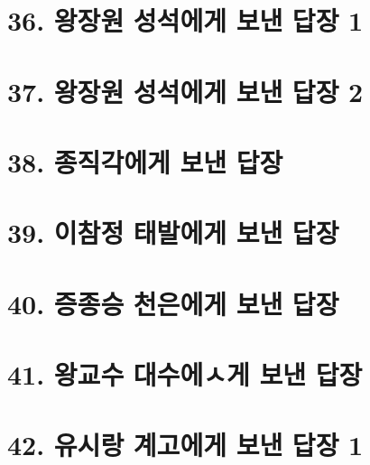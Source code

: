 \documentclass[12pt, a4paper, oneside]{book}
\let\stdsection\section
\renewcommand\section{\newpage\stdsection}
\begin{document}
 	\section{36. 왕장원 성석에게 보낸 답장 1 }

%
 	\section{37. 왕장원 성석에게 보낸 답장 2 }

%
 	\section{38. 종직각에게 보낸 답장 }

%
 	\section{39. 이참정 태발에게 보낸 답장 }

%
 	\section{40. 증종승 천은에게 보낸 답장 }

%
 	\section{41. 왕교수 대수에ㅅ게 보낸 답장 }

%
 	\section{42. 유시랑 계고에게 보낸 답장 1 }
\end{document}
